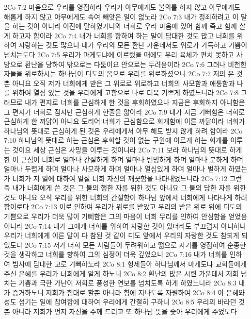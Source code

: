 2Co 7:2  마음으로 우리를 영접하라 우리가 아무에게도 불의를 하지 않고 아무에게도 해롭게 하지 않고 아무에게도 속여 빼앗은 일이 없노라
2Co 7:3  내가 정죄하려고 이 말을 하는 것이 아니라 이전에 말하였거니와 너희로 우리 마음에 있어 함께 죽고 함께 살게 하고자 함이라
2Co 7:4  내가 너희를 향하여 하는 말이 담대한 것도 많고 너희를 위하여 자랑하는 것도 많으니 내가 우리의 모든 환난 가운데서도 위로가 가득하고 기쁨이 넘치는도다
2Co 7:5  우리가 마게도냐에 이르렀을 때에도 우리 육체가 편치 못하고 사방으로 환난을 당하여 밖으로는 다툼이요 안으로는 두려움이라
2Co 7:6  그러나 비천한 자들을 위로하시는 하나님이 디도의 옴으로 우리를 위로하셨으니
2Co 7:7  저의 온 것뿐 아니요 오직 저가 너희에게 받은 그 위로로 위로하고 너희의 사모함과 애통함과 나를 위하여 열심 있는 것을 우리에게 고함으로 나로 더욱 기쁘게 하였느니라
2Co 7:8  그러므로 내가 편지로 너희를 근심하게 한 것을 후회하였으나 지금은 후회하지 아니함은 그 편지가 너희로 잠시만 근심하게 한줄을 앎이라
2Co 7:9  내가 지금 기뻐함은 너희로 근심하게 한 까닭이 아니요 도리어 너희가 근심함으로 회개함에 이른 까닭이라 너희가 하나님의 뜻대로 근심하게 된 것은 우리에게서 아무 해도 받지 않게 하려 함이라
2Co 7:10  하나님의 뜻대로 하는 근심은 후회할 것이 없는 구원에 이르게 하는 회개를 이루는 것이요 세상 근심은 사망을 이루는 것이니라
2Co 7:11  보라 하나님의 뜻대로 하게 한 이 근심이 너희로 얼마나 간절하게 하며 얼마나 변명하게 하며 얼마나 분하게 하며 얼마나 두렵게 하며 얼마나 사모하게 하며 얼마나 열심있게 하며 얼마나 벌하게 하였는가 너희가 저 일에 대하여 일절 너희 자신의 깨끗함을 나타내었느니라
2Co 7:12  그런즉 내가 너희에게 쓴 것은 그 불의 행한 자를 위한 것도 아니요 그 불의 당한 자를 위한 것도 아니요 오직 우리를 위한 너희의 간절함이 하나님 앞에서 너희에게 나타나게 하려 함이로다
2Co 7:13  이로 인하여 우리가 위로를 받았고 우리의 받은 위로 위에 디도의 기쁨으로 우리가 더욱 많이 기뻐함은 그의 마음이 너희 무리를 인하여 안심함을 얻었음이니라
2Co 7:14  내가 그에게 너희를 위하여 자랑한 것이 있더라도 부끄럽지 아니하니 우리가 너희에게 이른 말이 다 참된 것 같이 디도 앞에서 우리의 자랑한 것도 참되게 되었도다
2Co 7:15  저가 너희 모든 사람들이 두려워하고 떪으로 자기를 영접하여 순종한 것을 생각하고 너희를 향하여 그의 심정이 더욱 깊었으니
2Co 7:16  내가 너희를 인하여 범사에 담대한 고로 기뻐하노라
2Co 8:1  형제들아 하나님께서 마게도냐 교회들에게 주신 은혜를 우리가 너희에게 알게 하노니
2Co 8:2  환난의 많은 시련 가운데서 저희 넘치는 기쁨과 극한 가난이 저희로 풍성한 연보를 넘치도록 하게 하였느니라
2Co 8:3  내가 증거하노니 저희가 힘대로 할뿐 아니라 힘에 지나도록 자원하여
2Co 8:4  이 은혜와 성도 섬기는 일에 참여함에 대하여 우리에게 간절히 구하니
2Co 8:5  우리의 바라던 것뿐 아니라 저희가 먼저 자신을 주께 드리고 또 하나님 뜻을 좇아 우리에게 주었도다
